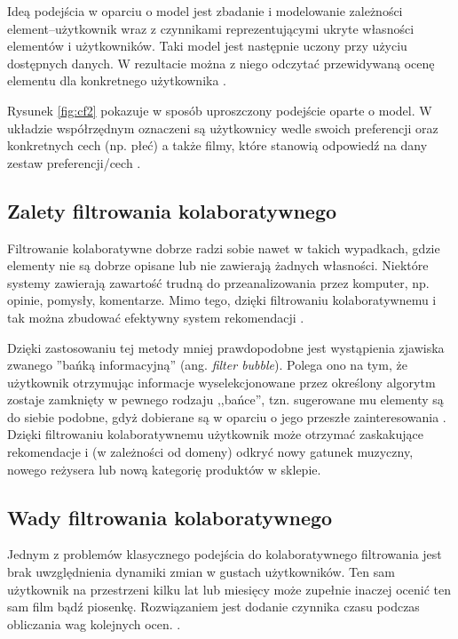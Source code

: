 \documentclass[twoside]{iisthesis}
\begin{document}
	  Ideą podejścia w oparciu o model jest zbadanie i modelowanie zależności element--użytkownik wraz z czynnikami reprezentującymi ukryte własności elementów i użytkowników. Taki model jest następnie uczony przy użyciu dostępnych danych. W rezultacie można z niego odczytać przewidywaną ocenę elementu dla konkretnego użytkownika \cite{id:ComprehensiveSurveyOfNeighborhoodBasedRecommendationMethods, id:AdvancesInCollaborativeFiltering}.
	  
	  Rysunek \ref{fig:cf2} pokazuje w sposób uproszczony podejście oparte o model. W układzie współrzędnym oznaczeni są użytkownicy wedle swoich preferencji oraz konkretnych cech (np. płeć) a także filmy, które stanowią odpowiedź na dany zestaw preferencji/cech \cite{koren2009matrix}. 
	  
	  \subsection{Zalety filtrowania kolaboratywnego}
	  
	  Filtrowanie kolaboratywne dobrze radzi sobie nawet w takich wypadkach, gdzie elementy nie są dobrze opisane lub nie zawierają żadnych własności. Niektóre systemy zawierają zawartość trudną do przeanalizowania przez komputer, np. opinie, pomysły, komentarze. Mimo tego, dzięki filtrowaniu kolaboratywnemu i tak można zbudować efektywny system rekomendacji \cite{melville2002content}.
	  
	  Dzięki zastosowaniu tej metody mniej prawdopodobne jest wystąpienia zjawiska zwanego ''bańką informacyjną'' (ang. \textit{filter bubble}). Polega ono na tym, że użytkownik otrzymując informacje wyselekcjonowane przez określony algorytm zostaje zamknięty w pewnego rodzaju ,,bańce'', tzn. sugerowane mu elementy są do siebie podobne, gdyż dobierane są w oparciu o jego przeszłe zainteresowania \cite{pariser2011filter}. Dzięki filtrowaniu kolaboratywnemu użytkownik może otrzymać zaskakujące rekomendacje i (w zależności od domeny) odkryć nowy gatunek muzyczny, nowego reżysera lub nową kategorię produktów w sklepie.	 
	  
	  \subsection{Wady filtrowania kolaboratywnego}
	  
	  Jednym z problemów klasycznego podejścia do kolaboratywnego filtrowania jest brak uwzględnienia dynamiki zmian w gustach użytkowników. Ten sam użytkownik na przestrzeni kilku lat lub miesięcy może zupełnie inaczej ocenić ten sam film bądź piosenkę. Rozwiązaniem jest dodanie czynnika czasu podczas obliczania wag kolejnych ocen. \cite{id:NewRecommentationAlgoritmBasedOnSocialNetwork,id:NextSongRecommendationWithTemporalDynamics,koren2009matrix}.
	  
\end{document}
